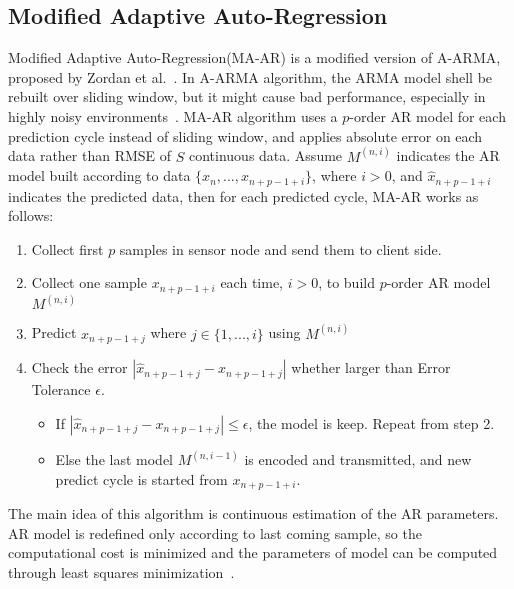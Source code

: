\subsection{Modified Adaptive Auto-Regression}
Modified Adaptive Auto-Regression(MA-AR) is a modified version of A-ARMA,
proposed by Zordan et al.~\cite{zordan2012compress}. In A-ARMA algorithm, the
ARMA model shell be rebuilt over sliding window, but it might cause bad
performance, especially in highly noisy environments~\cite{zordan2012compress}.
MA-AR algorithm uses a $p$-order AR model for each prediction cycle instead of
sliding window, and applies absolute error on each data rather than RMSE of $S$
continuous data. Assume $M^{(n, i)}$ indicates the AR model built according to
data $\{x_n, ..., x_{n+p-1+i} \}$, where $i>0$, and $\hat{x}_{n+p-1+i}$
indicates the predicted data, then for each predicted cycle, MA-AR works as
follows:

\begin{enumerate}
    \item Collect first $p$ samples in sensor node and send them to client side.
    \item Collect one sample $x_{n+p-1+i}$ each time, $i > 0$, to build
    $p$-order
    AR model $M^{(n, i)}$
    \item Predict $x_{n+p-1+j}$ where $j \in \{1, ..., i\}$ using $M^{(n, i)}$
    \item Check the error $ |\hat{x}_{n+p-1+j} - x_{n+p-1+j}|$ whether larger
    than Error Tolerance $\epsilon$.
        \begin{itemize}
            \item If $|\hat{x}_{n+p-1+j} - x_{n+p-1+j}| \leqslant \epsilon$, the
            model is keep. Repeat from step 2.
            \item Else the last model $M^{(n, i-1)}$ is encoded and transmitted,
            and new predict cycle is started from $x_{n+p-1+i}$.
        \end{itemize} 
\end{enumerate}
The main idea of this algorithm is continuous estimation of the AR parameters.
AR model is redefined only according to last coming sample, so the computational
cost is minimized and the parameters of model can be computed through least
squares minimization~\cite{zordan2012compress}. 

